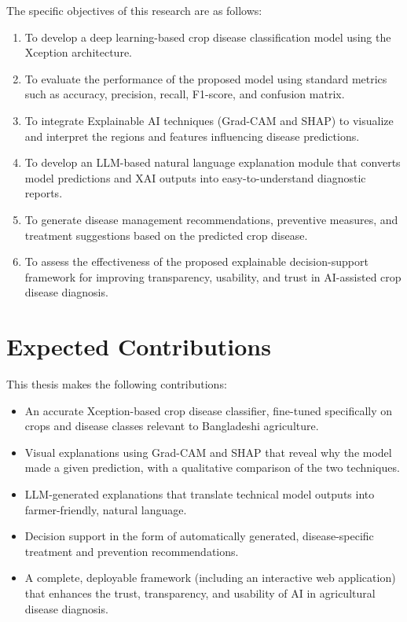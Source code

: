 \documentclass[12pt,a4paper,oneside]{report}
\begin{document}
The specific objectives of this research are as follows:
\begin{enumerate}[label=\arabic*.]
    \item To develop a deep learning-based crop disease classification model using the Xception architecture.
    \item To evaluate the performance of the proposed model using standard metrics such as accuracy, precision,
          recall, F1-score, and confusion matrix.
    \item To integrate Explainable AI techniques (Grad-CAM and SHAP) to visualize and interpret the regions and
          features influencing disease predictions.
    \item To develop an LLM-based natural language explanation module that converts model predictions and XAI
          outputs into easy-to-understand diagnostic reports.
    \item To generate disease management recommendations, preventive measures, and treatment suggestions based
          on the predicted crop disease.
    \item To assess the effectiveness of the proposed explainable decision-support framework for improving
          transparency, usability, and trust in AI-assisted crop disease diagnosis.
\end{enumerate}

\section{Expected Contributions}
This thesis makes the following contributions:
\begin{itemize}
    \item An accurate Xception-based crop disease classifier, fine-tuned specifically on crops and disease
          classes relevant to Bangladeshi agriculture.
    \item Visual explanations using Grad-CAM and SHAP that reveal why the model made a given prediction, with a
          qualitative comparison of the two techniques.
    \item LLM-generated explanations that translate technical model outputs into farmer-friendly, natural
          language.
    \item Decision support in the form of automatically generated, disease-specific treatment and prevention
          recommendations.
    \item A complete, deployable framework (including an interactive web application) that enhances the trust,
          transparency, and usability of AI in agricultural disease diagnosis.
\end{itemize}
\end{document}
